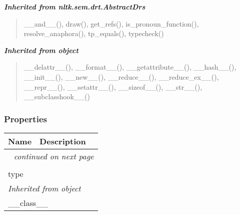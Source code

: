 \large{\textbf{\textit{Inherited from nltk.sem.drt.AbstractDrs}}}

\begin{quote}
\_\_and\_\_(), draw(), get\_refs(), is\_pronoun\_function(), resolve\_anaphora(), tp\_equals(), typecheck()
\end{quote}

\large{\textbf{\textit{Inherited from object}}}

\begin{quote}
\_\_delattr\_\_(), \_\_format\_\_(), \_\_getattribute\_\_(), \_\_hash\_\_(), \_\_init\_\_(), \_\_new\_\_(), \_\_reduce\_\_(), \_\_reduce\_ex\_\_(), \_\_repr\_\_(), \_\_setattr\_\_(), \_\_sizeof\_\_(), \_\_str\_\_(), \_\_subclasshook\_\_()
\end{quote}


  \subsubsection{Properties}

    \vspace{-1cm}
\hspace{\varindent}\begin{longtable}{|p{\varnamewidth}|p{\vardescrwidth}|l}
\cline{1-2}
\cline{1-2} \centering \textbf{Name} & \centering \textbf{Description}& \\
\cline{1-2}
\endhead\cline{1-2}\multicolumn{3}{r}{\small\textit{continued on next page}}\\\endfoot\cline{1-2}
\endlastfoot\multicolumn{2}{|l|}{\textit{Inherited from nltk.sem.drt.AbstractDrs}}\\
\multicolumn{2}{|p{\varwidth}|}{\raggedright type}\\
\cline{1-2}
\multicolumn{2}{|l|}{\textit{Inherited from object}}\\
\multicolumn{2}{|p{\varwidth}|}{\raggedright \_\_class\_\_}\\
\cline{1-2}
\end{longtable}



